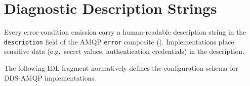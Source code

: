 \documentclass{../styles/zerodds-vendor-spec}
\begin{document}
\section{Diagnostic Description Strings}

Every error-condition emission  carry a
human-readable description string in the \texttt{description}
field of the AMQP \texttt{error} composite
(). Implementations
 place sensitive data (e.g.\ secret values,
authentication credentials) in the description.


The following IDL fragment normatively defines the configuration
schema for DDS-AMQP implementations.
\end{document}
